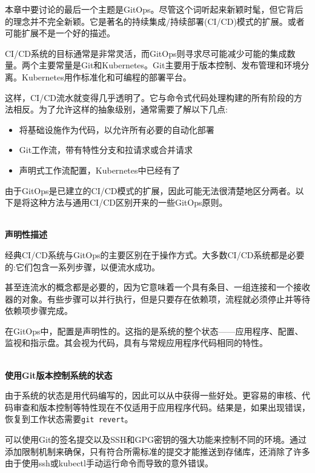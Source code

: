 
本章中要讨论的最后一个主题是GitOps。尽管这个词听起来新颖时髦，但它背后的理念并不完全新颖。它是著名的持续集成/持续部署(CI/CD)模式的扩展。或者可能扩展不是一个好的描述。

CI/CD系统的目标通常是非常灵活，而GitOps则寻求尽可能减少可能的集成数量。两个主要常量是Git和Kubernetes。Git主要用于版本控制、发布管理和环境分离。Kubernetes用作标准化和可编程的部署平台。

这样，CI/CD流水就变得几乎透明了。它与命令式代码处理构建的所有阶段的方法相反。为了允许这样的抽象级别，通常需要了解以下几点:

\begin{itemize}
\item 
将基础设施作为代码，以允许所有必要的自动化部署

\item 
Git工作流，带有特性分支和拉请求或合并请求

\item 
声明式工作流配置，Kubernetes中已经有了
\end{itemize}


由于GitOps是已建立的CI/CD模式的扩展，因此可能无法很清楚地区分两者。以下是将这种方法与通用CI/CD区别开来的一些GitOps原则。

\hspace*{\fill} \\ %
\noindent
\textbf{声明性描述}

经典CI/CD系统与GitOps的主要区别在于操作方式。大多数CI/CD系统都是必要的:它们包含一系列步骤，以便流水成功。

甚至连流水的概念都是必要的，因为它意味着一个具有条目、一组连接和一个接收器的对象。有些步骤可以并行执行，但是只要存在依赖项，流程就必须停止并等待依赖项步骤完成。

在GitOps中，配置是声明性的。这指的是系统的整个状态——应用程序、配置、监视和指示盘。其会视为代码，具有与常规应用程序代码相同的特性。

\hspace*{\fill} \\ %
\noindent
\textbf{使用Git版本控制系统的状态}

由于系统的状态是用代码编写的，因此可以从中获得一些好处。更容易的审核、代码审查和版本控制等特性现在不仅适用于应用程序代码。结果是，如果出现错误，恢复到工作状态需要\texttt{git revert}。

可以使用Git的签名提交以及SSH和GPG密钥的强大功能来控制不同的环境。通过添加限制机制来确保，只有符合所需标准的提交才能推送到存储库，还消除了许多由于使用ssh或kubectl手动运行命令而导致的意外错误。

